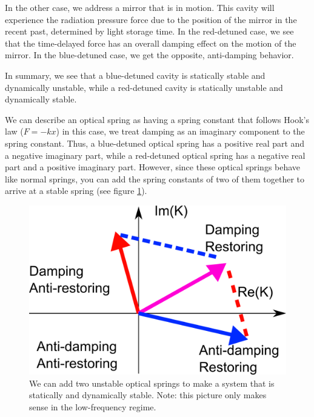 In the other case, we address a mirror that is in motion. This cavity will experience the radiation pressure force due to the position of the mirror in the recent past, determined by light storage time. In the red-detuned case, we see that the time-delayed force has an overall damping effect on the motion of the mirror. In the blue-detuned case, we get the opposite, anti-damping behavior. 

In summary, we see that a blue-detuned cavity is statically stable and dynamically unstable, while a red-detuned cavity is statically unstable and dynamically stable.

We can describe an optical spring as having a spring constant that follows Hook's law ($F=-kx$) in this case, we treat damping as an imaginary component to the spring constant. 
Thus, a blue-detuned optical spring has a positive real part and a negative imaginary part, while a red-detuned optical spring has a negative real part and a positive imaginary part.
However, since these optical springs behave like normal springs, you can add the spring constants of two of them together to arrive at a stable spring (see figure \ref{fig:opticalspringadd}).

\begin{figure}[hbtp]%
\center
\includegraphics[width=.5\textwidth]{figures/introduction/springadd}%
\caption[Adding Optical Springs]{We can add two unstable optical springs to make a system that is statically and dynamically stable. Note: this picture only makes sense in the low-frequency regime.}%
\label{fig:opticalspringadd}%
\end{figure}

